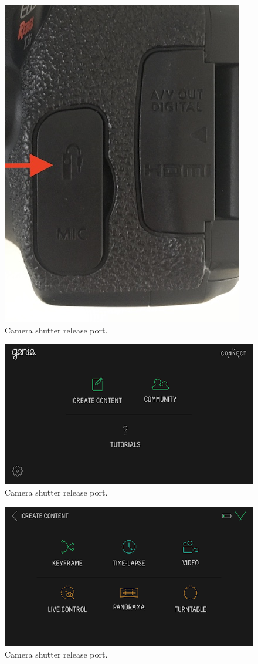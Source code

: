 \documentclass[
]{book}
\begin{document}
\begin{figure}

{\centering \includegraphics[width=0.5\linewidth]{Figures/shutter} 

}

\caption{Camera shutter release port.}\label{fig:shutter}
\end{figure}

\begin{figure}

{\centering \includegraphics[width=0.5\linewidth]{Figures/genie_root} 

}

\caption{Camera shutter release port.}\label{fig:genie-root}
\end{figure}

\begin{figure}

{\centering \includegraphics[width=0.5\linewidth]{Figures/genie_create} 

}

\caption{Camera shutter release port.}\label{fig:genie-content}
\end{figure}
\end{document}
